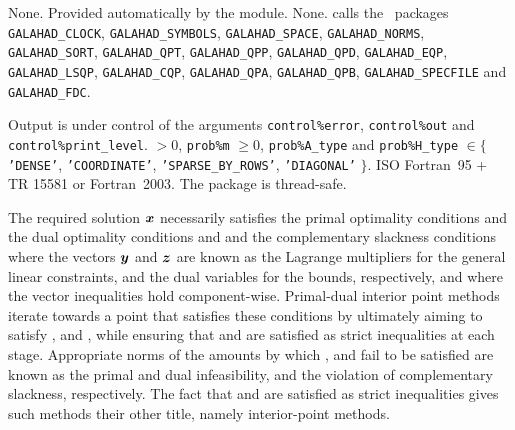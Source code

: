 \documentclass{galahad}
\newcommand{\packagename}{QPC}
\begin{document}
\galgeneral

\galcommon None.
\galworkspace Provided automatically by the module.
\galroutines None. 
\galmodules {\tt \packagename\_solve} calls the \galahad\ packages
{\tt GALAHAD\_CLOCK},
{\tt GALAHAD\_SY\-M\-BOLS},
{\tt GALAHAD\_SPACE}, 
{\tt GALAHAD\_NORMS}, 
{\tt GALAHAD\_SORT}, 
{\tt GALAHAD\_QPT},
{\tt GALAHAD\_QPP}, 
{\tt GALAHAD\_QPD}, 
\sloppy
{\tt GALAHAD\_EQP}, 
{\tt GALAHAD\_\-LSQP}, 
{\tt GALAHAD\_CQP}, 
{\tt GALAHAD\_QPA}, 
{\tt GALAHAD\_QPB},
{\tt GALAHAD\_SPECFILE} and
{\tt GALAHAD\_FDC}.

\galio Output is under control of the arguments
 {\tt control\%error}, {\tt control\%out} and {\tt control\%print\_level}.
 $> 0$, {\tt prob\%m} $\geq  0$, 
{\tt prob\%A\_type} and {\tt prob\%H\_type} $\in \{${\tt 'DENSE'}, 
 {\tt 'COORDINATE'}, {\tt 'SPARSE\_BY\_\-ROWS'}, {\tt 'DIAGONAL'} $\}$. 
\galportability ISO Fortran~95 + TR 15581 or Fortran~2003. 
The package is thread-safe.


\galmethod
The required solution ${\bm{x}}$ necessarily satisfies 
the primal optimality conditions
and 
the dual optimality conditions
and 
and the complementary slackness conditions 
where the vectors ${\bm{y}}$ and ${\bm{z}}$ are 
known as the Lagrange multipliers for
the general linear constraints, and the dual variables for the bounds,
respectively, and where the vector inequalities hold component-wise.
Primal-dual interior point methods iterate towards a point
that satisfies these conditions by ultimately aiming to satisfy
,  and , while ensuring that 
 and  are 
satisfied as strict inequalities at each stage. 
Appropriate norms of the amounts by 
which ,  and  fail to be satisfied are known as the
primal and dual infeasibility, and the violation of complementary slackness,
respectively. The fact that  and  are satisfied as strict 
inequalities gives such methods their other title, namely 
interior-point methods.
\end{document}

